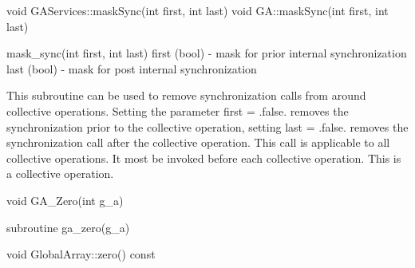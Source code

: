 \documentclass[12pt]{article}
\begin{document}
\begin{cxxapi}
\begin{cxxcode}
void GAServices::maskSync(int first, int last)
void GA::maskSync(int first, int last)
\end{cxxcode}
\begin{funcargs}
\end{funcargs}
\end{cxxapi}

\begin{pyapi}
\begin{pycode}
mask_sync(int first, int last)
   first (bool)   - mask for prior internal synchronization
   last (bool)    - mask for post internal synchronization
\end{pycode}
\end{pyapi}

\begin{desc}

This subroutine can be used to remove synchronization calls from around collective
operations. Setting the parameter first = .false. removes the synchronization prior
to the collective operation, setting last = .false. removes the synchronization call
after the collective operation. This call is applicable to all collective operations. 
It most be invoked before each collective operation.
This is a  collective operation.

\end{desc}


\begin{capi}
\begin{ccode}
void GA_Zero(int g_a)
\end{ccode}
\begin{funcargs}
\end{funcargs}
\end{capi}

\begin{fapi}
\begin{fcode}
subroutine ga_zero(g_a)
\end{fcode}
\begin{funcargs}
\end{funcargs}
\end{fapi}

\begin{cxxapi}
\begin{cxxcode}
void GlobalArray::zero() const
\end{cxxcode}
\end{cxxapi}
\end{document}
